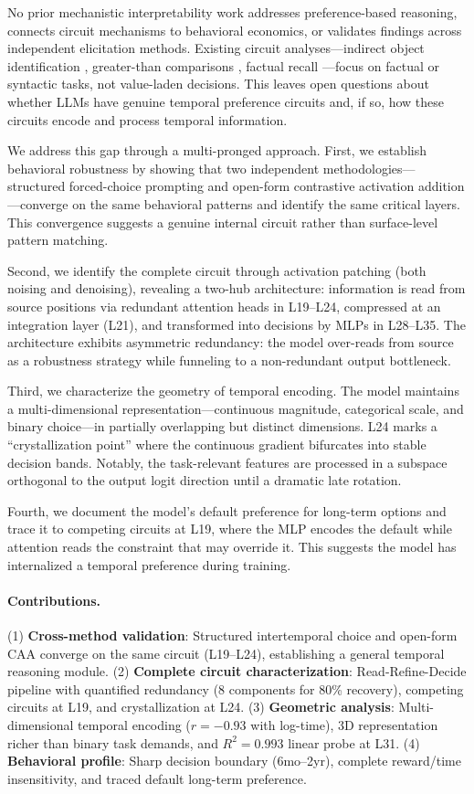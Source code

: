 \documentclass{article}
\begin{document}
No prior mechanistic interpretability work addresses preference-based reasoning, connects circuit mechanisms to behavioral economics, or validates findings across independent elicitation methods. Existing circuit analyses---indirect object identification \citep{wang2022interpretability}, greater-than comparisons \citep{hanna2023does}, factual recall \citep{meng2022locating}---focus on factual or syntactic tasks, not value-laden decisions. This leaves open questions about whether LLMs have genuine temporal preference circuits and, if so, how these circuits encode and process temporal information.

We address this gap through a multi-pronged approach. First, we establish behavioral robustness by showing that two independent methodologies---structured forced-choice prompting and open-form contrastive activation addition---converge on the same behavioral patterns and identify the same critical layers. This convergence suggests a genuine internal circuit rather than surface-level pattern matching.

Second, we identify the complete circuit through activation patching (both noising and denoising), revealing a two-hub architecture: information is read from source positions via redundant attention heads in L19--L24, compressed at an integration layer (L21), and transformed into decisions by MLPs in L28--L35. The architecture exhibits asymmetric redundancy: the model over-reads from source as a robustness strategy while funneling to a non-redundant output bottleneck.

Third, we characterize the geometry of temporal encoding. The model maintains a multi-dimensional representation---continuous magnitude, categorical scale, and binary choice---in partially overlapping but distinct dimensions. L24 marks a ``crystallization point'' where the continuous gradient bifurcates into stable decision bands. Notably, the task-relevant features are processed in a subspace orthogonal to the output logit direction until a dramatic late rotation.

Fourth, we document the model's default preference for long-term options and trace it to competing circuits at L19, where the MLP encodes the default while attention reads the constraint that may override it. This suggests the model has internalized a temporal preference during training.

\paragraph{Contributions.} (1) \textbf{Cross-method validation}: Structured intertemporal choice and open-form CAA converge on the same circuit (L19--L24), establishing a general temporal reasoning module. (2) \textbf{Complete circuit characterization}: Read-Refine-Decide pipeline with quantified redundancy (8 components for 80\% recovery), competing circuits at L19, and crystallization at L24. (3) \textbf{Geometric analysis}: Multi-dimensional temporal encoding ($r = -0.93$ with log-time), 3D representation richer than binary task demands, and $R^2 = 0.993$ linear probe at L31. (4) \textbf{Behavioral profile}: Sharp decision boundary (6mo--2yr), complete reward/time insensitivity, and traced default long-term preference.
\end{document}
